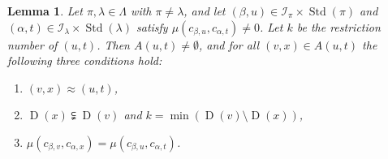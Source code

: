 \documentclass[10pt]{amsart}
\newtheorem{lemm}[theo]{Lemma}
\theoremstyle{definition}
\DeclareMathOperator{\STD}{Std}
\DeclareMathOperator{\D}{D}
\begin{document}
\begin{lemm}\label{k-minimallemma}
Let $\pi,\lambda\in\Lambda$ with $\pi\neq\lambda$, and let
$(\beta,u)\in\mathcal{I}_{\pi}\times\STD(\pi)$ and
$(\alpha,t)\in\mathcal{I}_{\lambda}\times\STD(\lambda)$ satisfy
$\mu(c_{\beta,u},c_{\alpha,t}) \neq 0$. Let $k$ be the
restriction number of $(u,t)$. Then $A(u,t)\neq\emptyset$, and for
all $(v,x)\in A(u,t)$ the following three conditions hold\textup{:}
\begin{enumerate}[label=(\roman*),topsep=1 pt]
\item
$(v,x)\approx (u,t)$,
\item
$\D(x)\subsetneqq\D(v)$ and $k=\min(\D(v)\setminus\D(x))$,
\item
$\mu(c_{\beta,v},c_{\alpha,x})=\mu(c_{\beta,u},c_{\alpha,t})$.
\end{enumerate}
\end{lemm}
\end{document}
